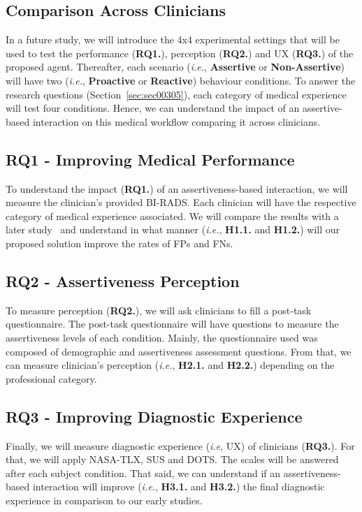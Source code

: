 \subsection{Comparison Across Clinicians}
\label{sec:sec00704}

In a future study, we will introduce the 4x4 experimental settings that will be used to test the performance ({\bf RQ1.}), perception ({\bf RQ2.}) and UX ({\bf RQ3.}) of the proposed agent.
Thereafter, each scenario ({\it i.e.}, {\bf Assertive} or {\bf Non-Assertive}) will have two ({\it i.e.}, {\bf Proactive} or {\bf Reactive}) behaviour conditions.
To answer the research questions (Section~\ref{sec:sec00305}), each category of medical experience will test four conditions.
Hence, we can understand the impact of an assertive-based interaction on this medical workflow comparing it across clinicians.

\subsection{RQ1 - Improving Medical Performance}
\label{sec:sec00705}

To understand the impact ({\bf RQ1.}) of an assertiveness-based interaction, we will measure the clinician's provided BI-RADS.
Each clinician will have the respective category of medical experience associated.
We will compare the results with a later study~\cite{https://doi.org/10.13140/rg.2.2.16566.14403/1} and understand in what manner ({\it i.e.}, {\bf H1.1.} and {\bf H1.2.}) will our proposed solution improve the rates of FPs and FNs.

\subsection{RQ2 - Assertiveness Perception}
\label{sec:sec00706}

To measure perception ({\bf RQ2.}), we will ask clinicians to fill a post-task questionnaire.
The post-task questionnaire will have questions to measure the assertiveness levels of each condition.
Mainly, the questionnaire used was composed of demographic and assertiveness assessment questions.
From that, we can measure clinician's perception ({\it i.e.}, {\bf H2.1.} and {\bf H2.2.}) depending on the professional category.

\subsection{RQ3 - Improving Diagnostic Experience}
\label{sec:sec00707}

Finally, we will measure diagnostic experience ({\it i.e}, UX) of clinicians ({\bf RQ3.}).
For that, we will apply NASA-TLX, SUS and DOTS.
The scales will be answered after each subject condition.
That said, we can understand if an assertiveness-based interaction will improve ({\it i.e.}, {\bf H3.1.} and {\bf H3.2.}) the final diagnostic experience in comparison to our early studies.